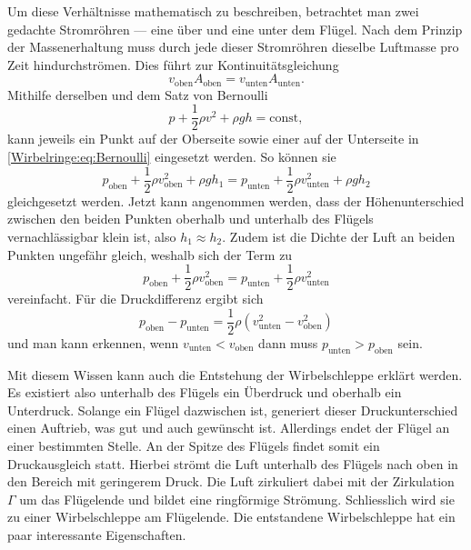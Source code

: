 Um diese Verhältnisse mathematisch zu beschreiben, betrachtet man zwei gedachte Stromröhren --- eine über und eine unter dem Flügel. 
Nach dem Prinzip der Massenerhaltung muss durch jede dieser Stromröhren dieselbe Luftmasse pro Zeit hindurchströmen. Dies führt zur Kontinuitätsgleichung
\begin{equation*}
v_{\text{oben}}A_{\text{oben}} 
=
v_{\text{unten}}A_{\text{unten}}.
\end{equation*}
Mithilfe derselben und dem Satz von Bernoulli
\begin{equation}
    p+\frac{1}{2}\rho v^2+\rho gh
    =
    \text{const}
    \label{Wirbelringe:eq:Bernoulli},
\end{equation}
kann jeweils ein Punkt auf der Oberseite sowie einer auf der Unterseite in \eqref{Wirbelringe:eq:Bernoulli} eingesetzt werden.
So können sie 
\begin{equation*}
p_{\text{oben}}+\frac{1}{2}\rho v^2_{\text{oben}} + \rho gh_1 
=
p_{\text{unten}}+\frac{1}{2}\rho v^2_{\text{unten}}+\rho gh_2
\end{equation*}
gleichgesetzt werden.
Jetzt kann angenommen werden, dass der Höhenunterschied zwischen den beiden Punkten oberhalb und unterhalb des Flügels vernachlässigbar klein ist, also \(h_1\approx h_2\).
Zudem ist die Dichte der Luft an beiden Punkten ungefähr gleich, weshalb sich der Term zu 
\begin{equation*}
p_{\text{oben}}+\frac{1}{2}\rho v^2_{\text{oben}} 
=
p_{\text{unten}}+\frac{1}{2}\rho v^2_{\text{unten}}
\end{equation*}
vereinfacht.
Für die Druckdifferenz ergibt sich
\begin{equation*}
p_{\text{oben}}-p_{\text{unten}} 
=
\frac{1}{2}\rho( v^2_{\text{unten}}-v^2_{\text{oben}})
\end{equation*}
und man kann erkennen, wenn \(v_{\text{unten}} < v_{\text{oben}}\) dann muss \(p_{\text{unten}} > p_{\text{oben}}\) sein.

Mit diesem Wissen kann auch die Entstehung der Wirbelschleppe erklärt werden. 
Es existiert also unterhalb des Flügels ein Überdruck und oberhalb ein Unterdruck.
Solange ein Flügel dazwischen ist, generiert dieser Druckunterschied einen Auftrieb, was gut und auch gewünscht ist.
Allerdings endet der Flügel an einer bestimmten Stelle.
An der Spitze des Flügels findet somit ein Druckausgleich statt.
Hierbei strömt die Luft unterhalb des Flügels nach oben in den Bereich mit geringerem Druck. 
Die Luft zirkuliert dabei mit der Zirkulation \(\Gamma\) um das Flügelende und bildet eine ringförmige Strömung.
Schliesslich wird sie zu einer Wirbelschleppe am Flügelende.
Die entstandene Wirbelschleppe hat ein paar interessante Eigenschaften.

